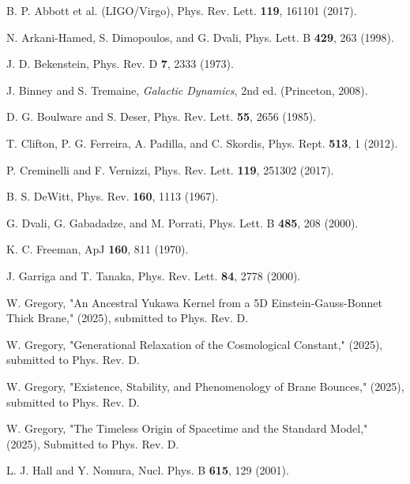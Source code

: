 \documentclass[aps,prd,onecolumn,10pt,superscriptaddress,nofootinbib,floatfix]{revtex4-2}
\begin{document}
\begin{thebibliography}{99}

B. P. Abbott et al. (LIGO/Virgo), Phys. Rev. Lett. \textbf{119}, 161101 (2017).

N. Arkani-Hamed, S. Dimopoulos, and G. Dvali, Phys. Lett. B \textbf{429}, 263 (1998).

J. D. Bekenstein, Phys. Rev. D \textbf{7}, 2333 (1973).

J. Binney and S. Tremaine, \textit{Galactic Dynamics}, 2nd ed. (Princeton, 2008).

D. G. Boulware and S. Deser, Phys. Rev. Lett. \textbf{55}, 2656 (1985).

T. Clifton, P. G. Ferreira, A. Padilla, and C. Skordis, Phys. Rept. \textbf{513}, 1 (2012).

P. Creminelli and F. Vernizzi, Phys. Rev. Lett. \textbf{119}, 251302 (2017).

B. S. DeWitt, Phys. Rev. \textbf{160}, 1113 (1967).

G. Dvali, G. Gabadadze, and M. Porrati, Phys. Lett. B \textbf{485}, 208 (2000).

K. C. Freeman, ApJ \textbf{160}, 811 (1970).

J. Garriga and T. Tanaka, Phys. Rev. Lett. \textbf{84}, 2778 (2000).

W. Gregory, "An Ancestral Yukawa Kernel from a 5D Einstein-Gauss-Bonnet Thick Brane," (2025), submitted to Phys. Rev. D.

W. Gregory, "Generational Relaxation of the Cosmological Constant," (2025), submitted to Phys. Rev. D.

W. Gregory, "Existence, Stability, and Phenomenology of Brane Bounces," (2025), submitted to Phys. Rev. D.

W. Gregory, "The Timeless Origin of Spacetime and the Standard Model," (2025), Submitted to Phys. Rev. D.

L. J. Hall and Y. Nomura, Nucl. Phys. B \textbf{615}, 129 (2001).


\end{thebibliography}
\end{document}
